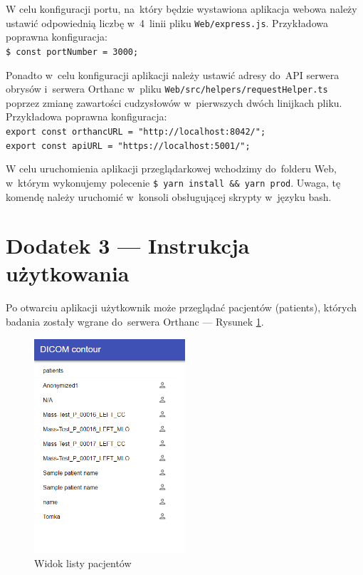 \documentclass[a4paper,11pt,twoside,openright]{report}
\theoremstyle{definition}
\begin{document}
W celu konfiguracji portu, na~który będzie wystawiona aplikacja webowa należy
ustawić odpowiednią liczbę w~4~linii pliku \texttt{Web/express.js}. Przykładowa poprawna
konfiguracja:\\
\texttt{\$ const portNumber = 3000;}

Ponadto w~celu konfiguracji aplikacji należy ustawić adresy do~API serwera obrysów
i~serwera Orthanc w~pliku \texttt{Web/src/helpers/requestHelper.ts} poprzez zmianę zawartości
cudzysłowów w~pierwszych dwóch linijkach pliku. 	Przykładowa poprawna konfiguracja:\\
\texttt{export const orthancURL = "http://localhost:8042/";}\\
\texttt{export const apiURL = "https://localhost:5001/";}

W celu uruchomienia aplikacji przeglądarkowej wchodzimy do~folderu Web, w~którym
wykonujemy polecenie \texttt{\$ yarn install \&\& yarn prod}. Uwaga, tę komendę
należy uruchomić w~konsoli obsługującej skrypty w~języku bash.




\newpage
\chapter*{Dodatek 3 --- Instrukcja użytkowania}

Po otwarciu aplikacji użytkownik może przeglądać pacjentów (patients), których
badania zostały wgrane do~serwera Orthanc --- Rysunek \ref{fig:1}.

\begin{figure}[h!]
	\center
	\includegraphics[width=0.5\textwidth]{1}
	\caption{Widok listy pacjentów}
    	\label{fig:1}
\end{figure}
\end{document}

